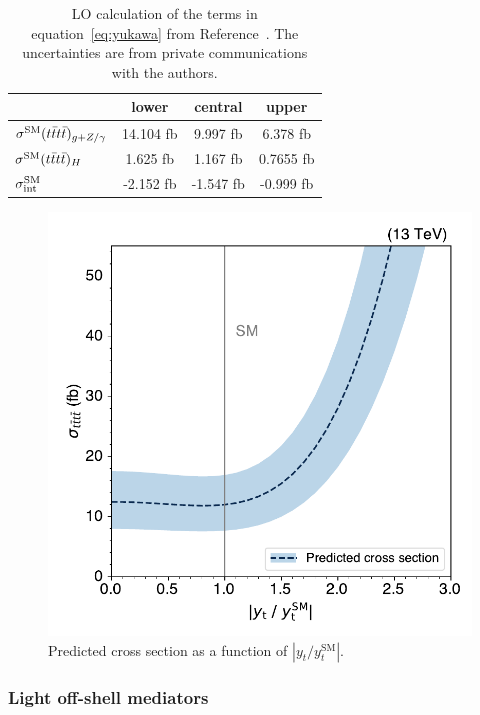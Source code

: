 \begin{table} [h!]
\begin{center}
{\renewcommand{\arraystretch}{1.3}
\begin{tabular}{l|ccc}
\hline
   & lower & central & upper \\
\hline
$ \sigma^{\text{SM}}(t\bar{t}t\bar{t})_{g+Z/\gamma}  $ & 14.104 fb & 9.997 fb &  6.378 fb \\
$ \sigma^{\text{SM}}(t\bar{t}t\bar{t})_H $                  & 1.625 fb &  1.167 fb &  0.7655 fb \\
$\sigma^{\text{SM}}_{\rm int} $                   & -2.152 fb &  -1.547 fb &  -0.999 fb \\
\hline
\end{tabular}}
\caption{LO calculation of the terms in equation~\ref{eq:yukawa} from
Reference~\cite{THEORY:TopYukawaTTTT}.  
The uncertainties are from private communications with the authors.}
\label{tab:yukawa}
\end{center}
\end{table}


\begin{figure}[!htbp]
    \centering
    \includegraphics[width=0.75\linewidth]{figs/ftan/cross_section_yt.pdf}
    \caption{
        Predicted \tttt cross section as a function of $|y_t/y_t^{\text{SM}}|$.
    }
    \label{fig:cross_section_yt}
\end{figure}

\FloatBarrier

\subsubsection{Light off-shell mediators}

